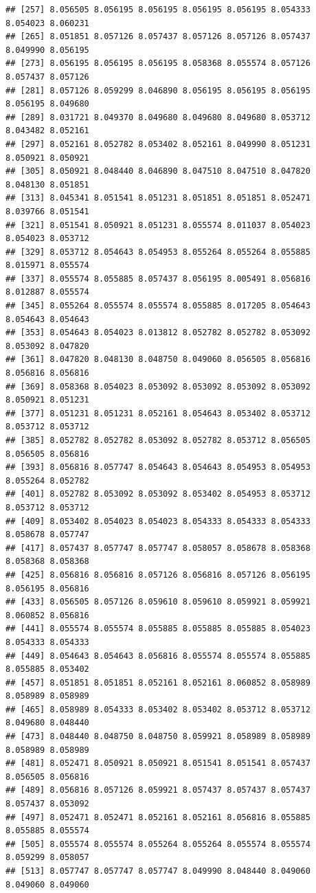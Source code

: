 \documentclass[
]{article}
\begin{document}
\begin{verbatim}
## [257] 8.056505 8.056195 8.056195 8.056195 8.056195 8.054333 8.054023 8.060231
## [265] 8.051851 8.057126 8.057437 8.057126 8.057126 8.057437 8.049990 8.056195
## [273] 8.056195 8.056195 8.056195 8.058368 8.055574 8.057126 8.057437 8.057126
## [281] 8.057126 8.059299 8.046890 8.056195 8.056195 8.056195 8.056195 8.049680
## [289] 8.031721 8.049370 8.049680 8.049680 8.049680 8.053712 8.043482 8.052161
## [297] 8.052161 8.052782 8.053402 8.052161 8.049990 8.051231 8.050921 8.050921
## [305] 8.050921 8.048440 8.046890 8.047510 8.047510 8.047820 8.048130 8.051851
## [313] 8.045341 8.051541 8.051231 8.051851 8.051851 8.052471 8.039766 8.051541
## [321] 8.051541 8.050921 8.051231 8.055574 8.011037 8.054023 8.054023 8.053712
## [329] 8.053712 8.054643 8.054953 8.055264 8.055264 8.055885 8.015971 8.055574
## [337] 8.055574 8.055885 8.057437 8.056195 8.005491 8.056816 8.012887 8.055574
## [345] 8.055264 8.055574 8.055574 8.055885 8.017205 8.054643 8.054643 8.054643
## [353] 8.054643 8.054023 8.013812 8.052782 8.052782 8.053092 8.053092 8.047820
## [361] 8.047820 8.048130 8.048750 8.049060 8.056505 8.056816 8.056816 8.056816
## [369] 8.058368 8.054023 8.053092 8.053092 8.053092 8.053092 8.050921 8.051231
## [377] 8.051231 8.051231 8.052161 8.054643 8.053402 8.053712 8.053712 8.053712
## [385] 8.052782 8.052782 8.053092 8.052782 8.053712 8.056505 8.056505 8.056816
## [393] 8.056816 8.057747 8.054643 8.054643 8.054953 8.054953 8.055264 8.052782
## [401] 8.052782 8.053092 8.053092 8.053402 8.054953 8.053712 8.053712 8.053712
## [409] 8.053402 8.054023 8.054023 8.054333 8.054333 8.054333 8.058678 8.057747
## [417] 8.057437 8.057747 8.057747 8.058057 8.058678 8.058368 8.058368 8.058368
## [425] 8.056816 8.056816 8.057126 8.056816 8.057126 8.056195 8.056195 8.056816
## [433] 8.056505 8.057126 8.059610 8.059610 8.059921 8.059921 8.060852 8.056816
## [441] 8.055574 8.055574 8.055885 8.055885 8.055885 8.054023 8.054333 8.054333
## [449] 8.054643 8.054643 8.056816 8.055574 8.055574 8.055885 8.055885 8.053402
## [457] 8.051851 8.051851 8.052161 8.052161 8.060852 8.058989 8.058989 8.058989
## [465] 8.058989 8.054333 8.053402 8.053402 8.053712 8.053712 8.049680 8.048440
## [473] 8.048440 8.048750 8.048750 8.059921 8.058989 8.058989 8.058989 8.058989
## [481] 8.052471 8.050921 8.050921 8.051541 8.051541 8.057437 8.056505 8.056816
## [489] 8.056816 8.057126 8.059921 8.057437 8.057437 8.057437 8.057437 8.053092
## [497] 8.052471 8.052471 8.052161 8.052161 8.056816 8.055885 8.055885 8.055574
## [505] 8.055574 8.055574 8.055264 8.055264 8.055574 8.055574 8.059299 8.058057
## [513] 8.057747 8.057747 8.057747 8.049990 8.048440 8.049060 8.049060 8.049060

\end{verbatim}
\end{document}
